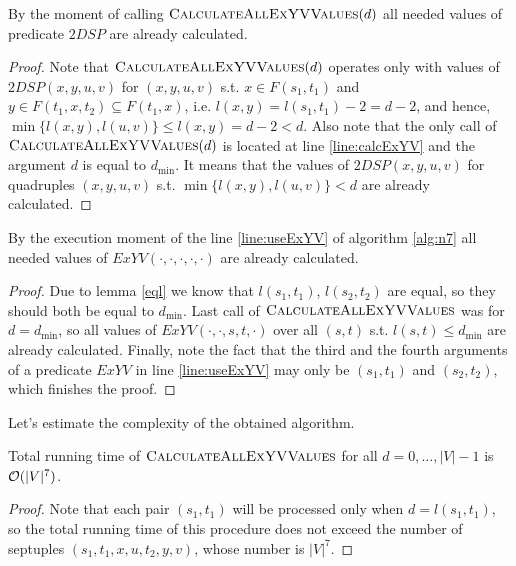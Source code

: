 \begin{proposition} \label{n7_corr1}
By the moment of calling $\textsc{CalculateAllExYVValues}(d)$ all needed values of predicate $2DSP$ are already calculated.
\end{proposition}
\begin{proof}
Note that $\textsc{CalculateAllExYVValues}(d)$ operates only with values of $2DSP(x, y, u, v)$ for $(x, y, u, v)$ s.t. $x \in F(s_1, t_1)$ and $y \in F(t_1,x,t_2) \subseteq F(t_1, x)$, i.e. $l(x, y) = l(s_1, t_1) - 2 = d - 2$, and hence, $\min\{l(x, y), l(u, v)\} \leq l(x, y) = d - 2 < d$. Also note that the only call of $\textsc{CalculateAllExYVValues}(d)$ is located at line \ref{line:calcExYV} and the argument $d$ is equal to $d_{\min}$. It means that the values of $2DSP(x, y, u, v)$ for quadruples $(x, y, u, v)$ s.t. $\min\{l(x, y), l(u, v)\} < d$ are already calculated. 
\end{proof}

\begin{proposition} \label{n7_corr2}
By the execution moment of the line \ref{line:useExYV} of algorithm \ref{alg:n7} all needed values of $ExYV(\cdot, \cdot, \cdot, \cdot, \cdot)$ are already calculated.
\end{proposition}
\begin{proof}
Due to lemma \ref{eql} we know that $l(s_1, t_1)$, $l(s_2, t_2)$ are equal, so they should both be equal to $d_{\min}$. Last call of $\textsc{CalculateAllExYVValues}$ was for $d = d_{\min}$, so all values of $ExYV(\cdot, \cdot, s, t, \cdot)$ over all $(s, t)$ s.t. $l(s, t) \leq d_{\min}$ are already calculated. Finally, note the fact that the third and the fourth arguments of a predicate $ExYV$ in line \ref{line:useExYV} may only be $(s_1, t_1)$ and $(s_2, t_2)$, which finishes the proof.
\end{proof}

Let's estimate the complexity of the obtained algorithm.

\begin{proposition} \label{n7_rt1}
Total running time of $\textsc{CalculateAllExYVValues}$ for all $d = 0, \ldots, |V|-1$ is $\mathcal{O}(|V|^7)$. 
\end{proposition}
\begin{proof}
Note that each pair $(s_1, t_1)$ will be processed only when $d = l(s_1, t_1)$, so the total running time of this procedure does not exceed the number of septuples $(s_1, t_1, x, u, t_2, y, v)$, whose number is $|V|^7$.
\end{proof}

